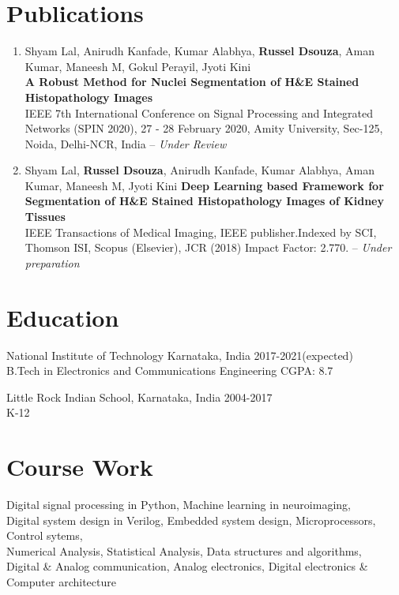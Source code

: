 \documentclass[letterpaper]{article}
\renewenvironment{itemize}{
  \begin{list}{}{
    \setlength{\leftmargin}{1.5em}
  }
}{
  \end{list}
}
\newcommand{\smallGreyFont}[1]{\textcolor{black!80}{\small{#1}}}
\begin{document}
\section*{Publications}
  \begin{enumerate}
    \item Shyam Lal, Anirudh Kanfade, Kumar Alabhya, \textbf{Russel Dsouza}, Aman Kumar, Maneesh M, Gokul Perayil, Jyoti Kini \\
    \textbf{A Robust Method for Nuclei Segmentation of H\&E Stained Histopathology Images}\\
    IEEE 7th International Conference on Signal Processing and Integrated Networks (SPIN 2020), 27 - 28 February 2020, Amity University, Sec-125, Noida, Delhi-NCR, India -- \textit{Under Review}

    \item Shyam Lal, \textbf{Russel Dsouza}, Anirudh Kanfade, Kumar Alabhya, Aman Kumar, Maneesh M, Jyoti Kini
    \textbf{Deep Learning based Framework for Segmentation of H\&E Stained Histopathology Images of Kidney Tissues}\\
    IEEE Transactions of Medical Imaging, IEEE publisher.Indexed by SCI, Thomson ISI, Scopus (Elsevier), JCR (2018) Impact Factor: 2.770. -- \textit{Under preparation}
  \end{enumerate}


\section*{Education}
  \begin{itemize}
    \item National Institute of Technology Karnataka, India\hfill
    \smallGreyFont{2017-2021(expected)}
    \\
    \smallGreyFont{B.Tech in Electronics and Communications Engineering}
    \hfill{\smallGreyFont{CGPA: 8.7}}

    \item Little Rock Indian School, Karnataka, India\hfill
    \smallGreyFont{2004-2017}
    \\
    \smallGreyFont{K-12}
  \end{itemize}



\section*{Course Work}
  \begin{itemize}
    \item  Digital signal processing in Python, Machine learning in neuroimaging, \\
    Digital system design in Verilog, Embedded system design,
    Microprocessors, Control sytems,\\
    Numerical Analysis, Statistical Analysis, Data structures and algorithms, \\
    Digital \& Analog communication, Analog electronics, Digital electronics \& Computer architecture
  \end{itemize}
\end{document}
